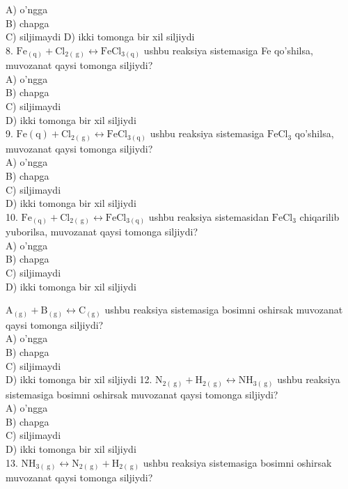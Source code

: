 A) o'ngga\\
B) chapga\\
C) siljimaydi 
D) ikki tomonga bir xil siljiydi\\
8. $\mathrm{Fe}_{(\mathrm{q})}+\mathrm{Cl}_{2(\mathrm{~g})} \leftrightarrow \mathrm{FeCl}_{3(\mathrm{q})}$ ushbu reaksiya sistemasiga Fe qo'shilsa, muvozanat qaysi tomonga siljiydi?\\
A) o'ngga\\
B) chapga\\
C) siljimaydi\\
D) ikki tomonga bir xil siljiydi\\
9. $\mathrm{Fe}(\mathrm{q})+\mathrm{Cl}_{2(\mathrm{~g})} \leftrightarrow \mathrm{FeCl}_{3(\mathrm{q})}$ ushbu reaksiya sistemasiga $\mathrm{FeCl}_{3}$ qo'shilsa, muvozanat qaysi tomonga siljiydi?\\
A) o'ngga\\
B) chapga\\
C) siljimaydi\\
D) ikki tomonga bir xil siljiydi\\
10. $\mathrm{Fe}_{(\mathrm{q})}+\mathrm{Cl}_{2(\mathrm{~g})} \leftrightarrow \mathrm{FeCl}_{3(\mathrm{q})}$ ushbu reaksiya sistemasidan $\mathrm{FeCl}_{3}$ chiqarilib yuborilsa, muvozanat qaysi tomonga siljiydi?\\
A) o'ngga\\
B) chapga\\
C) siljimaydi\\
D) ikki tomonga bir xil siljiydi
  \item $\mathrm{A}_{(\mathrm{g})}+\mathrm{B}_{(\mathrm{g})} \leftrightarrow \mathrm{C}_{(\mathrm{g})}$ ushbu reaksiya sistemasiga bosimni oshirsak muvozanat qaysi tomonga siljiydi?\\
A) o'ngga\\
B) chapga\\
C) siljimaydi\\
D) ikki tomonga bir xil siljiydi
12. $\mathrm{N}_{2(\mathrm{~g})}+\mathrm{H}_{2(\mathrm{~g})} \leftrightarrow \mathrm{NH}_{3(\mathrm{~g})}$ ushbu reaksiya sistemasiga bosimni oshirsak muvozanat qaysi tomonga siljiydi?\\
A) o'ngga\\
B) chapga\\
C) siljimaydi\\
D) ikki tomonga bir xil siljiydi\\
13. $\mathrm{NH}_{3(\mathrm{~g})} \leftrightarrow \mathrm{N}_{2(\mathrm{~g})}+\mathrm{H}_{2(\mathrm{~g})}$ ushbu reaksiya sistemasiga bosimni oshirsak muvozanat qaysi tomonga siljiydi?\\
